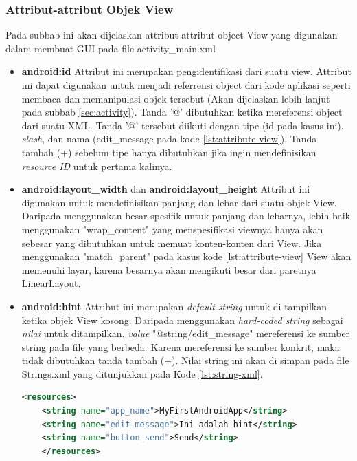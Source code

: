 \subsubsection{Attribut-attribut Objek View}
\label{sssec:attribut_attribut_objek_view}
Pada subbab ini akan dijelaskan attribut-attribut object View yang digunakan dalam membuat GUI pada file activity\_main.xml
\begin{itemize}
	\item \textbf{android:id}
	Attribut ini merupakan pengidentifikasi dari suatu view. Attribut ini dapat digunakan untuk menjadi referrensi object dari kode aplikasi seperti membaca dan memanipulasi objek tersebut (Akan dijelaskan lebih lanjut pada subbab \ref{sec:activity}). Tanda '@' dibutuhkan ketika mereferensi object dari suatu XML. Tanda '@' tersebut diikuti dengan tipe (id pada kasus ini), \textit{slash}, dan nama (edit\_message pada kode \ref{lst:attribute-view}). Tanda tambah (+) sebelum tipe hanya dibutuhkan jika ingin mendefinisikan \textit{resource ID} untuk pertama kalinya.
	\item \textbf{android:layout\_width} dan \textbf{android:layout\_height}
	Attribut ini digunakan untuk mendefinisikan panjang dan lebar dari suatu objek View. Daripada menggunakan besar spesifik untuk panjang dan lebarnya, lebih baik menggunakan "wrap\_content" yang menspesifikasi viewnya hanya akan sebesar yang dibutuhkan untuk memuat konten-konten dari View. Jika menggunakan "match\_parent" pada kasus kode \ref{lst:attribute-view} View akan memenuhi layar, karena besarnya akan mengikuti besar dari paretnya LinearLayout.


	\item \textbf{android:hint}
	Attribut ini merupakan \textit{default string} untuk di tampilkan ketika objek View kosong. Daripada menggunakan \textit{hard-coded string} sebagai \textit{nilai} untuk ditampilkan, \textit{value} "@string/edit\_message" mereferensi ke sumber string pada file yang berbeda. Karena mereferensi ke sumber konkrit, maka tidak dibutuhkan tanda tambah (+). Nilai string ini akan di simpan pada file Strings.xml yang ditunjukkan pada Kode \ref{lst:string-xml}.
	\begin{lstlisting}[caption={Contoh kode pada string.xml},label={lst:string-xml},language=xml]
	<resources>
    <string name="app_name">MyFirstAndroidApp</string>
    <string name="edit_message">Ini adalah hint</string>
    <string name="button_send">Send</string>
	</resources>

\end{lstlisting}



\end{itemize}

